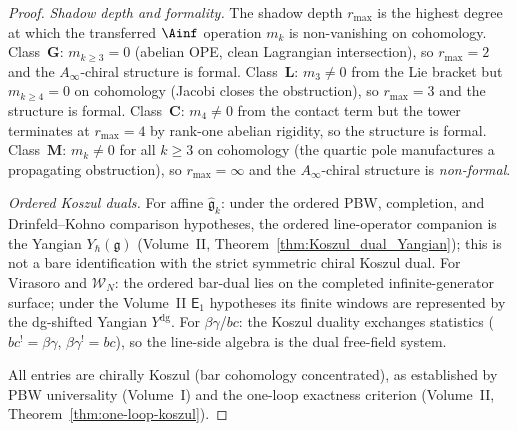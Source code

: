 \begin{proof}
\emph{Shadow depth and formality.}
The shadow depth $r_{\max}$ is the highest degree at which the
transferred $\Ainf$ operation $m_k$ is non-vanishing on cohomology.
Class~$\mathbf{G}$: $m_{k \ge 3} = 0$ (abelian OPE, clean
Lagrangian intersection), so $r_{\max} = 2$ and the $A_\infty$-chiral
structure is formal.
Class~$\mathbf{L}$: $m_3 \ne 0$ from the Lie bracket but
$m_{k \ge 4} = 0$ on cohomology (Jacobi closes the obstruction),
so $r_{\max} = 3$ and the structure is formal.
Class~$\mathbf{C}$: $m_4 \ne 0$ from the contact term but the
tower terminates at $r_{\max} = 4$ by rank-one abelian
rigidity, so the structure is formal.
Class~$\mathbf{M}$: $m_k \ne 0$ for all $k \ge 3$ on
cohomology (the quartic pole manufactures a propagating
obstruction), so $r_{\max} = \infty$ and the $A_\infty$-chiral
structure is \emph{non-formal}.

\emph{Ordered Koszul duals.}
For affine $\widehat{\mathfrak{g}}_k$: under the ordered PBW,
completion, and Drinfeld--Kohno comparison hypotheses, the ordered
line-operator companion is the Yangian $Y_\hbar(\mathfrak{g})$
(Volume~II, Theorem~\ref*{thm:Koszul_dual_Yangian}); this is not a
bare identification with the strict symmetric chiral Koszul dual.
For Virasoro and $\mathcal{W}_N$: the ordered bar-dual lies on the
completed infinite-generator surface; under the Volume~II
$\mathsf{E}_1$ hypotheses its finite windows are represented by the
dg-shifted Yangian $Y^{\mathrm{dg}}$.
For $\beta\gamma$/$bc$: the Koszul duality exchanges
statistics ($bc^! = \beta\gamma$, $\beta\gamma^! = bc$),
so the line-side algebra is the dual free-field system.

All entries are chirally Koszul (bar cohomology concentrated),
as established by PBW universality (Volume~I) and the
one-loop exactness criterion (Volume~II,
Theorem~\ref*{thm:one-loop-koszul}).
\end{proof}

